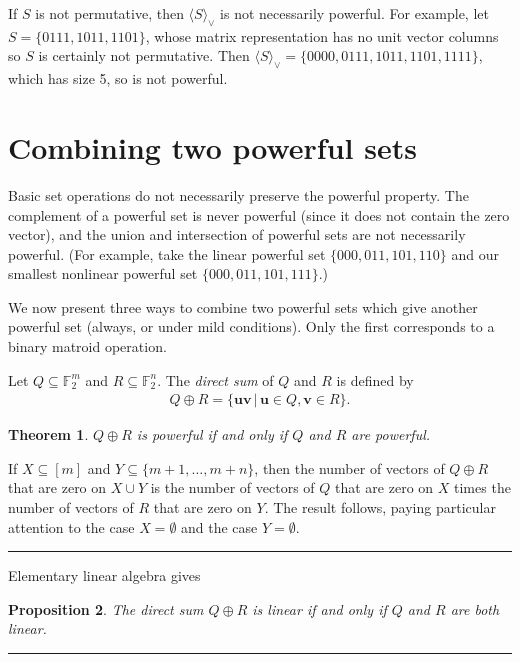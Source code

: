 \documentclass[12pt]{article}
\newtheorem{thm}{Theorem}[section]
\newtheorem{pro}[thm]{Proposition}
\def\pf{\noindent {\it Proof.\ }}
\def\qed{\hfill \rule{4pt}{7pt}}
\begin{document}
If $S$ is not permutative, then $\langle S\rangle_{\vee}$ is not necessarily powerful.  For example,
let $S=\{0111, 1011, 1101\}$, whose matrix representation has no unit vector columns
so $S$ is certainly not permutative.  Then $\langle S\rangle_{\vee}=\{0000, 0111, 1011, 1101, 1111\}$,
which has size 5, so is not powerful.



\section{Combining two powerful sets}
\label{sec:combining}

Basic set operations do not necessarily preserve the powerful property.  The
complement of a powerful set is never powerful (since it does not contain the zero vector),
and the union and intersection of powerful sets are not necessarily powerful.  (For example,
take the linear powerful set $\{000, 011, 101, 110\}$ and our smallest nonlinear powerful set $\{000, 011, 101, 111\}$.)

We now present three ways to combine two powerful sets which give another powerful set
(always, or under mild conditions).  Only the first corresponds to a binary matroid operation.

Let $Q\subseteq\mathbb{F}_2^{m}$ and $R\subseteq\mathbb{F}_2^{n}$.
The \textit{direct sum} of $Q$ and $R$ is defined by
\begin{align*}
Q\oplus R=\{\mathbf{u}\mathbf{v}\,|\, \mathbf{u}\in Q, \mathbf{v}\in R\}.
\end{align*}

\begin{thm}
$Q\oplus R$ is powerful if and only if $Q$ and $R$ are powerful.
\end{thm}
\pf If $X\subseteq[m]$ and $Y\subseteq\{m+1,\ldots,m+n\}$, then the number of vectors of $Q\oplus R$ that are zero on $X\cup Y$ is the number of vectors of $Q$ that are zero on $X$  times the number of vectors of $R$ that are zero on $Y$.  The result follows, paying particular
attention to the case $X=\emptyset$ and the case $Y=\emptyset$.\qed

Elementary linear algebra gives

\begin{pro}
The direct sum $Q\oplus R$ is linear if and only if $Q$ and $R$ are both linear.
\qed
\end{pro}
\end{document}
